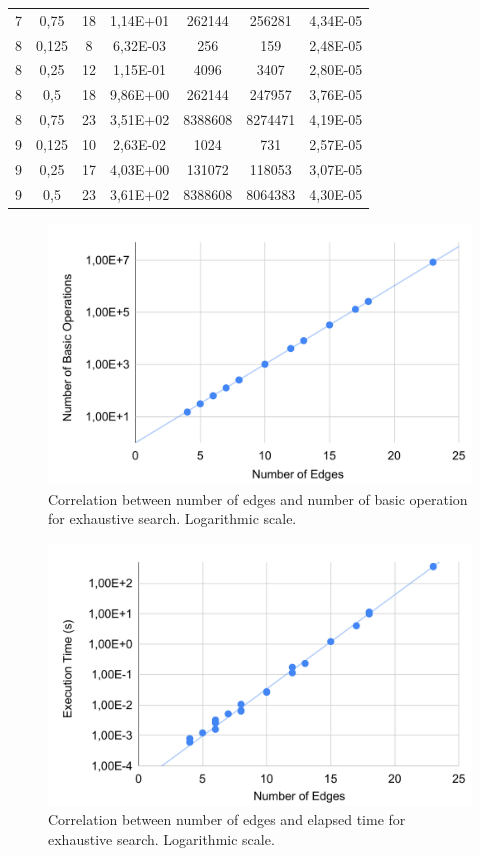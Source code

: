 \begin{table}[ht!]
{\begin{tabular}{ccccccc}
7 & 0,75 & 18 & 1,14E+01 & 262144 & 256281 & 4,34E-05 \\
8 & 0,125 & 8 & 6,32E-03 & 256 & 159 & 2,48E-05 \\
8 & 0,25 & 12 & 1,15E-01 & 4096 & 3407 & 2,80E-05 \\
8 & 0,5 & 18 & 9,86E+00 & 262144 & 247957 & 3,76E-05 \\
8 & 0,75 & 23 & 3,51E+02 & 8388608 & 8274471 & 4,19E-05 \\
9 & 0,125 & 10 & 2,63E-02 & 1024 & 731 & 2,57E-05 \\
9 & 0,25 & 17 & 4,03E+00 & 131072 & 118053 & 3,07E-05 \\
9 & 0,5 & 23 & 3,61E+02 & 8388608 & 8064383 & 4,30E-05
\end{tabular}%
}
\end{table}

\newpage

\begin{figure}[!ht]
    \centering
    \includegraphics[width=0.9\linewidth]{figs/ex-basic-operations.pdf}
    \caption{Correlation between number of edges and number of basic operation for exhaustive search. Logarithmic scale.}
    \label{fig:ex-op}
\end{figure}

\begin{figure}[!ht]
    \centering
    \includegraphics[width=0.9\linewidth]{figs/ex-time.pdf}
    \caption{Correlation between number of edges and elapsed time for exhaustive search. Logarithmic scale.}
    \label{fig:ex-time}
\end{figure}

